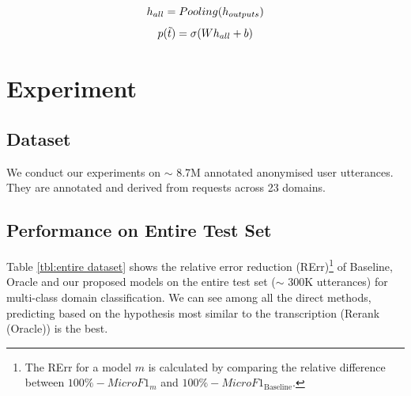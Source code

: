 \begin{equation}
\small{
	h_{all} = Pooling(h_{outputs})
}
\label{pooling}
\end{equation}
\begin{equation}
\small{
	p(\Tilde{t}) = \sigma(Wh_{all} +b)
}
\label{mlp_1}
\end{equation}
\section{Experiment}
\label{speech:exp}
\subsection{Dataset}
We conduct our experiments on $\sim$ 8.7M annotated anonymised user utterances. They are annotated and derived from requests across 23 domains. 
\subsection{Performance on Entire Test Set}

Table \ref{tbl:entire dataset} shows the relative error reduction (RErr)\footnote{The RErr for a model $m$ is calculated by comparing the relative difference between $100\% - MicroF1_{m}$ and $100\% - MicroF1_{\text{Baseline}}$.  } of Baseline, Oracle and our proposed models on the entire test set ($\sim$ 300K utterances) for multi-class domain classification. 
We can see among all the direct methods, predicting based on the hypothesis most similar to the transcription (Rerank (Oracle)) is the best.


